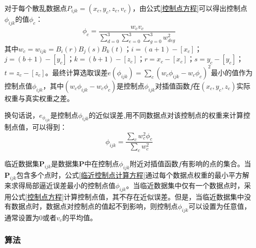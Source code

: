对于每个散乱数据点$ P_{ijk} = \left( x_{c}, y_{c}, z_{c},v_{c} \right) $，由公式\ref{控制点方程}可以得出控制点$ \phi_{ijk} $的值$ \phi_{c} $：
\begin{equation}
    \phi_{c} = \frac{w_{c}v_{c}}{\sum_{d=0}^{3}\sum_{e=0}^{3}\sum_{g=0}^{3}w_{deg}^{2}}
\end{equation}
其中$ w_{c} = w_{ijk} = B_{i}(r)B_{j}(s)B_{k}(t) $；$ i=(a+1)-\left[ x_{c} \right] $；$  j=(b+1)-\left[ y_{c} \right] $；$  k=(b+1)-\left[ z_{c} \right] $；$ r=x_{c}-\left[ x_{c} \right] $；$ s=y_{c}-\left[ y_{c} \right] $；$ t=z_{c}-\left[ z_{c} \right] $。最终计算选取误差$ e\left( \phi_{ijk} \right) = \sum_{c}\left( w_{c}\phi_{ijk} - w_{c}\phi_{c} \right)^{2} $最小的值作为控制点值$ \phi_{ijk} $，其中$ \left( w_{c}\phi_{ijk} - w_{c}\phi_{c} \right) $是控制点$ \phi_{ijk} $对插值函数$ f $在$ \left( x_{c}, y_{c}, z_{c} \right) $实际权重与真实权重之差。

换句话说，$ e_{\phi_{ijk}} $是控制点$ \phi_{ijk} $的近似误差,用不同数据点对该控制点的权重来计算控制点值，可以得到：
\begin{equation}
    \phi_{ijk} = \frac{\sum_{c}w_{c}^{2}\phi_{c}}{\sum_{c}w_{c}^{2}}
    \label{临近控制点计算方程}
\end{equation}

临近数据集$ \mathbf{P}_{ijk} $是数据集$ \mathbf{P} $中在控制点$ \phi_{ijk} $附近对插值函数$ f $有影响的点的集合。当$ \mathbf{P}_{ijk} $包含多个点时，公式\ref{临近控制点计算方程}通过每个数据点权重的最小平方解来求得局部逼近误差最小的控制点值$ \phi_{ijk} $。当临近数据集中仅有一个数据点时，采用公式\ref{控制点方程}计算控制点值，其不存在近似误差。但是，当临近数据集中没有数据点时，数据点对控制点的值起不到影响，则控制点$ \phi_{ijk} $可以设置为任意值，通常设置为0或者$ v_{c} $的平均值。

\subsubsection{算法}

